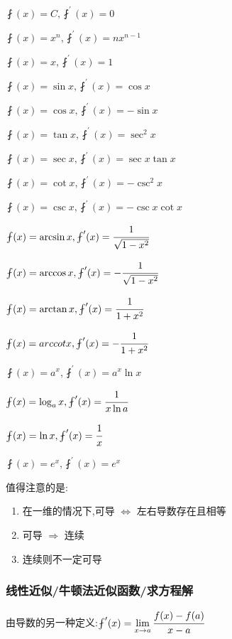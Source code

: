 \documentclass[UTF8,12pt]{ctexbook}
\newcommand{\limNormal}[1]{\lim\limits_{#1}}
\newcommand{\derivative}{^\prime}
\newcommand{\fDerivative}[1]{\fint\derivative(#1)}
\newcommand{\defFunction}[1]{f(#1)}
\begin{document}
{{{{    $\fint(x) = C, \fint\derivative(x) = 0$

    $\fint(x) = x^n, \fint\derivative(x) = nx^{n-1}$

    $\fint(x) = x, \fint\derivative(x) = 1$

    $\fint(x) = \sin x, \fint\derivative(x) = \cos x$

    $\fint(x) = \cos x, \fint\derivative(x) = -\sin x$

    $\fint(x) = \tan x, \fint\derivative(x) = \sec^2 x$

    $\fint(x) = \sec x, \fint\derivative(x) = \sec x\tan x$

    $\fint(x) = \cot x, \fint\derivative(x) = -\csc^2 x$

    $\fint(x) = \csc x, \fint\derivative(x) = -\csc x\cot x$

    $\fint(x) = \arcsin x, \fint\derivative(x) = \cfrac{1}{\sqrt{1 - x^2}}$

    $\fint(x) = \arccos x, \fint\derivative(x) = -\cfrac{1}{\sqrt{1 - x^2}}$

    $\fint(x) = \arctan x, \fint\derivative(x) = \cfrac{1}{1 + x^2}$

    $\fint(x) = arccotx, \fint\derivative(x) = -\cfrac{1}{1 + x^2}$

    $\fint(x) = a^x, \fint\derivative(x) = a^x\ln x$

    $\fint(x) = \log_a x, \fint\derivative(x) = \cfrac{1}{x\ln a}$

    $\fint(x) = \ln x, \fint\derivative(x)= \cfrac{1}{x}$

    $\fint(x) = e^x, \fint\derivative(x) = e^x$
  }%
  \newline

  值得注意的是:
  \begin{enumerate}
    \item 在一维的情况下,可导 $\Leftrightarrow$ 左右导数存在且相等

    \item 可导 $\Rightarrow$ 连续

    \item 连续则不一定可导
  \end{enumerate}

  \subsubsection{线性近似/牛顿法近似函数/求方程解}{
    由导数的另一种定义:$\fDerivative{x} = \limNormal{x \to a}\cfrac{\defFunction{x} - \defFunction{a}}{x - a}$

}}}}
\end{document}

